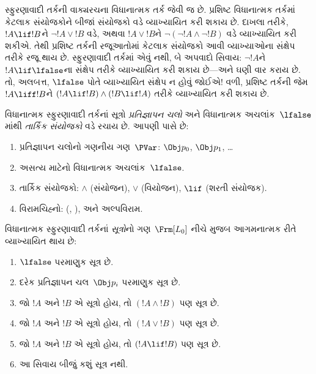 સ્ફુરણાવાદી તર્કની વાક્યરચના વિધાનાત્મક તર્ક જેવી જ છે.
પ્રશિષ્ટ વિધાનાત્મક તર્કમાં કેટલાક સંયોજકોને બીજાં સંયોજકો
વડે વ્યાખ્યાયિત કરી શકાય છે. દાખલા તરીકે, $!A \lif !B$ને
$\lnot !A \lor !B$ વડે, અથવા $!A \lor !B$ને
$\lnot(\lnot !A \land \lnot !B)$ વડે વ્યાખ્યાયિત કરી શકીએ.
તેથી પ્રશિષ્ટ તર્કની રજૂઆતોમાં કેટલાક સંયોજકો આવી વ્યાખ્યાઓના
સંક્ષેપ તરીકે રજૂ થાય છે. સ્ફુરણાવાદી તર્કમાં એવું નથી, બે
અપવાદો સિવાય: $\lnot !A$ને $!A \lif \lfalse$ના સંક્ષેપ
તરીકે વ્યાખ્યાયિત કરી શકાય છે---અને ઘણી વાર કરાય છે. તો,
અલબત્ત, $\lfalse$ પોતે વ્યાખ્યાયિત સંક્ષેપ ન હોવું જોઈએ!{}
વળી, પ્રશિષ્ટ તર્કની જેમ $!A \liff !B$ને
$(!A \lif !B) \land (!B \lif !A)$ તરીકે વ્યાખ્યાયિત કરી
શકાય છે.

વિધાનાત્મક સ્ફુરણાવાદી તર્કનાં સૂત્રો
\emph{પ્રતિજ્ઞાપન ચલો} અને વિધાનાત્મક
અચલાંક~$\lfalse$માંથી \emph{તાર્કિક સંયોજકો} વડે રચાય છે.
આપણી પાસે છે:

\begin{enumerate}
\item પ્રતિજ્ઞાપન ચલોનો ગણનીય ગણ~$\PVar$:
  $\Obj p_0$,
  $\Obj p_1$, \dots
  \item અસત્ય માટેનો વિધાનાત્મક અચલાંક~$\lfalse$.
\item તાર્કિક સંયોજકો: $\land$ (સંયોજન), $\lor$ (વિયોજન),
  $\lif$ (શરતી સંયોજક).
\item વિરામચિહ્નો: (, ), અને અલ્પવિરામ.
\end{enumerate}

\begin{defn}[સૂત્ર]
 વિધાનાત્મક સ્ફુરણાવાદી તર્કનાં
\emph{સૂત્રો}નો ગણ~$\Frm[L_0]$ નીચે મુજબ આગમનાત્મક
રીતે વ્યાખ્યાયિત થાય છે:
\begin{enumerate}
\item $\lfalse$ પરમાણુક સૂત્ર છે.

\item દરેક પ્રતિજ્ઞાપન ચલ~$\Obj p_i$ પરમાણુક
  સૂત્ર છે.

\item જો $!A$ અને $!B$ એ સૂત્રો હોય, તો $(!A \land
  !B)$ પણ સૂત્ર છે.

\item જો $!A$ અને $!B$ એ સૂત્રો હોય, તો $(!A \lor !B)$
  પણ સૂત્ર છે.

\item જો $!A$ અને $!B$ એ સૂત્રો હોય, તો $(!A \lif !B)$
  પણ સૂત્ર છે.

\item આ સિવાય બીજું કશું સૂત્ર નથી.
\end{enumerate}
\end{defn}

